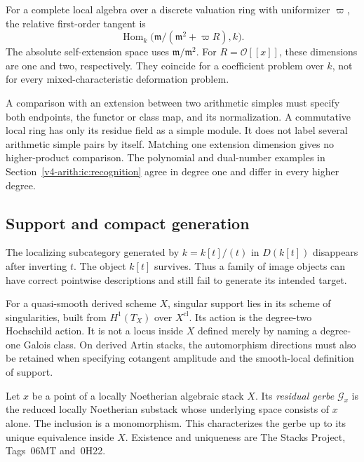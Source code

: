 For a complete local algebra over a discrete valuation ring
with uniformizer \(\varpi\), the relative first-order tangent is
\[
 \operatorname{Hom}_k
 \bigl(\mathfrak m/(\mathfrak m^2+\varpi R),k\bigr).
\]
The absolute self-extension space uses
\(\mathfrak m/\mathfrak m^2\).
For \(R=\mathcal O[[x]]\), these dimensions are one and two,
respectively. They coincide for a coefficient problem over \(k\),
not for every mixed-characteristic deformation problem.

A comparison with an extension between two arithmetic simples
must specify both endpoints, the functor or class map, and its
normalization. A commutative local ring has only its residue field
as a simple module. It does not label several arithmetic simple
pairs by itself.
Matching one extension dimension gives no higher-product comparison.
The polynomial and dual-number examples in
Section~\ref{v4-arith:ic:recognition} agree in degree one and differ
in every higher degree.

\subsection{Support and compact generation}

The localizing subcategory generated by \(k=k[t]/(t)\) in
\(D(k[t])\) disappears after inverting \(t\).
The object \(k[t]\) survives. Thus a family of image objects
can have correct pointwise descriptions and still fail to generate
its intended target.

For a quasi-smooth derived scheme \(X\), singular support lies
in its scheme of singularities, built from
\(H^1(T_X)\) over \(X^{\mathrm{cl}}\).
Its action is the degree-two Hochschild action.
It is not a locus inside \(X\) defined merely by naming a
degree-one Galois class. On derived Artin stacks, the automorphism
directions must also be retained when specifying cotangent amplitude
and the smooth-local definition of support.

\begin{definition}\label{v4-arith:ic:residual-gerbe}
Let \(x\) be a point of a locally Noetherian algebraic stack \(X\).
Its \emph{residual gerbe} \(\mathcal G_x\) is the reduced locally
Noetherian substack whose underlying space consists of \(x\) alone.
The inclusion is a monomorphism.
This characterizes the gerbe up to its unique equivalence inside \(X\).
Existence and uniqueness are The Stacks Project,
Tags~06MT and~0H22.
\end{definition}

